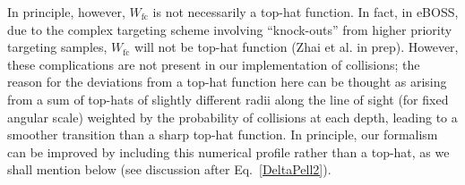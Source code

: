                                                                                                                                                                                                                                                                           In principle, however,
                                                                                                                                                                                                                                                                          $W_\mathrm{fc}$ is not necessarily a top-hat function. In fact,
                                                                                                                                                                                                                                                                          in eBOSS, due to the complex targeting scheme involving ``knock-outs'' from 
                                                                                                                                                                                                                                                                          higher priority targeting samples, $W_\mathrm{fc}$ will not be top-hat function 
                                                                                                                                                                                                                                                                          (Zhai et al. in prep). However, these complications are not present in our implementation of collisions; the reason for the deviations from a top-hat function here can be thought as arising from a sum of top-hats of slightly different radii along the line of sight (for fixed angular scale) weighted by the probability of collisions at each depth, leading to a smoother transition than a sharp top-hat function. In principle, our formalism  can be improved by including this numerical profile rather than a top-hat, as we shall mention below (see discussion after Eq.~\ref{DeltaPell2}). 


